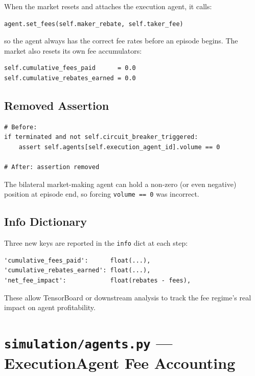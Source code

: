 \documentclass[11pt,a4paper]{article}
\begin{document}
When the market resets and attaches the execution agent, it calls:

\begin{lstlisting}
agent.set_fees(self.maker_rebate, self.taker_fee)
\end{lstlisting}

so the agent always has the correct fee rates before an episode begins.
The market also resets its own fee accumulators:

\begin{lstlisting}
self.cumulative_fees_paid      = 0.0
self.cumulative_rebates_earned = 0.0
\end{lstlisting}

\subsection{Removed Assertion}

\begin{lstlisting}
# Before:
if terminated and not self.circuit_breaker_triggered:
    assert self.agents[self.execution_agent_id].volume == 0

# After: assertion removed
\end{lstlisting}

The bilateral market-making agent can hold a non-zero (or even negative)
position at episode end, so forcing \texttt{volume == 0} was incorrect.

\subsection{Info Dictionary}

Three new keys are reported in the \texttt{info} dict at each step:

\begin{lstlisting}
'cumulative_fees_paid':      float(...),
'cumulative_rebates_earned': float(...),
'net_fee_impact':            float(rebates - fees),
\end{lstlisting}

These allow TensorBoard or downstream analysis to track the fee regime's
real impact on agent profitability.

\section{\texttt{simulation/agents.py} — ExecutionAgent Fee Accounting}
\end{document}
